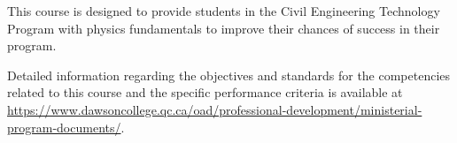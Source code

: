 {This course is designed to provide students in the Civil Engineering Technology Program with physics fundamentals to improve their chances of success in their program.
\smallskip

Detailed information regarding the objectives and standards for the competencies related to this course and the specific performance criteria is available at \url{https://www.dawsoncollege.qc.ca/oad/professional-development/ministerial-program-documents/}.}

